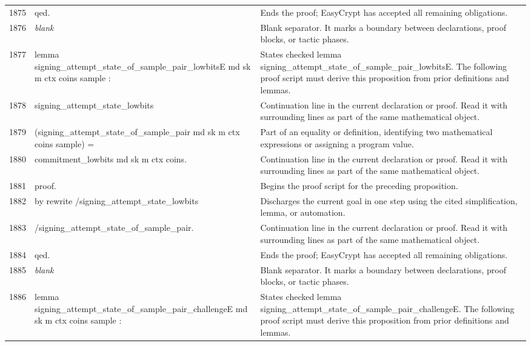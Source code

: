 \documentclass[10pt]{article}
\begin{document}
\begin{longtable}{r L{0.53\textwidth} L{0.37\textwidth}}
1875 & {\ttfamily\scriptsize qed.} & Ends the proof; EasyCrypt has accepted all remaining obligations. \\
1876 & {\ttfamily\scriptsize \emph{blank}} & Blank separator.  It marks a boundary between declarations, proof blocks, or tactic phases. \\
1877 & {\ttfamily\scriptsize lemma signing\_attempt\_state\_of\_sample\_pair\_lowbitsE md sk m ctx coins sample :} & States checked lemma signing\_attempt\_state\_of\_sample\_pair\_lowbitsE.  The following proof script must derive this proposition from prior definitions and lemmas. \\
1878 & {\ttfamily\scriptsize   signing\_attempt\_state\_lowbits} & Continuation line in the current declaration or proof.  Read it with surrounding lines as part of the same mathematical object. \\
1879 & {\ttfamily\scriptsize     (signing\_attempt\_state\_of\_sample\_pair md sk m ctx coins sample) =} & Part of an equality or definition, identifying two mathematical expressions or assigning a program value. \\
1880 & {\ttfamily\scriptsize   commitment\_lowbits md sk m ctx coins.} & Continuation line in the current declaration or proof.  Read it with surrounding lines as part of the same mathematical object. \\
1881 & {\ttfamily\scriptsize proof.} & Begins the proof script for the preceding proposition. \\
1882 & {\ttfamily\scriptsize by rewrite /signing\_attempt\_state\_lowbits} & Discharges the current goal in one step using the cited simplification, lemma, or automation. \\
1883 & {\ttfamily\scriptsize            /signing\_attempt\_state\_of\_sample\_pair.} & Continuation line in the current declaration or proof.  Read it with surrounding lines as part of the same mathematical object. \\
1884 & {\ttfamily\scriptsize qed.} & Ends the proof; EasyCrypt has accepted all remaining obligations. \\
1885 & {\ttfamily\scriptsize \emph{blank}} & Blank separator.  It marks a boundary between declarations, proof blocks, or tactic phases. \\
1886 & {\ttfamily\scriptsize lemma signing\_attempt\_state\_of\_sample\_pair\_challengeE md sk m ctx coins sample :} & States checked lemma signing\_attempt\_state\_of\_sample\_pair\_challengeE.  The following proof script must derive this proposition from prior definitions and lemmas. \\

\end{longtable}
\end{document}
